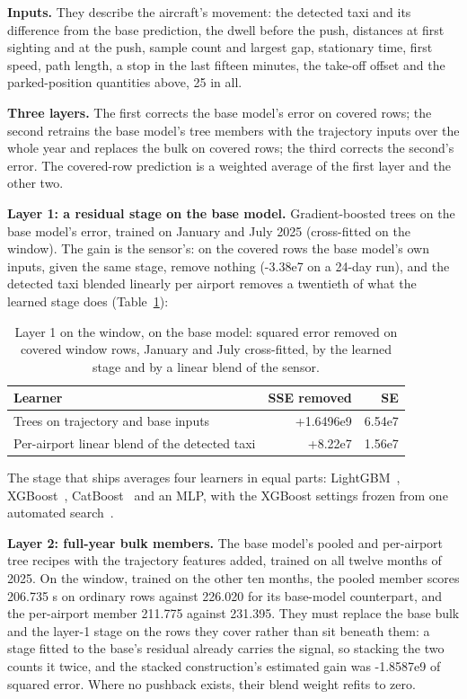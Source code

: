 \documentclass[
  manuscript=article,
  layout=preprint,
  year=2026,
  volume=x,
]{extra/joas}
\begin{document}
\textbf{Inputs.} They describe the aircraft's movement: the detected taxi and its difference from the base prediction, the dwell before the push, distances at first sighting and at the push, sample count and largest gap, stationary time, first speed, path length, a stop in the last fifteen minutes, the take-off offset and the parked-position quantities above, 25 in all.

\textbf{Three layers.} The first corrects the base model's error on covered rows; the second retrains the base model's tree members with the trajectory inputs over the whole year and replaces the bulk on covered rows; the third corrects the second's error. The covered-row prediction is a weighted average of the first layer and the other two.

\textbf{Layer 1: a residual stage on the base model.} Gradient-boosted trees on the base model's error, trained on January and July 2025 (cross-fitted on the window). The gain is the sensor's: on the covered rows the base model's own inputs, given the same stage, remove nothing (-3.38e7 on a 24-day run), and the detected taxi blended linearly per airport removes a twentieth of what the learned stage does (Table~\ref{tab:10}):

\begin{table}[htbp!]
  \centering
  \small
  \setlength{\tabcolsep}{5pt}\renewcommand{\arraystretch}{1.15}
  \caption{Layer 1 on the window, on the base model: squared error removed on covered window rows, January and July cross-fitted, by the learned stage and by a linear blend of the sensor.}
  \label{tab:10}
  \begin{tabular*}{\linewidth}{@{\extracolsep{\fill}}lrr}
  \toprule
  \textbf{Learner} & \textbf{SSE removed} & \textbf{SE} \\
  \midrule
  Trees on trajectory and base inputs & +1.6496e9 & 6.54e7 \\
  Per-airport linear blend of the detected taxi & +8.22e7 & 1.56e7 \\
  \bottomrule
  \end{tabular*}
\end{table}

The stage that ships averages four learners in equal parts: LightGBM~\cite{ke2017lightgbm}, XGBoost~\cite{chen2016xgboost}, CatBoost~\cite{prokhorenkova2018catboost} and an MLP, with the XGBoost settings frozen from one automated search~\cite{wang2021flaml}.

\textbf{Layer 2: full-year bulk members.} The base model's pooled and per-airport tree recipes with the trajectory features added, trained on all twelve months of 2025. On the window, trained on the other ten months, the pooled member scores 206.735 s on ordinary rows against 226.020 for its base-model counterpart, and the per-airport member 211.775 against 231.395. They must replace the base bulk and the layer-1 stage on the rows they cover rather than sit beneath them: a stage fitted to the base's residual already carries the signal, so stacking the two counts it twice, and the stacked construction's estimated gain was -1.8587e9 of squared error. Where no pushback exists, their blend weight refits to zero.
\end{document}

